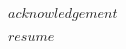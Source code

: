 \backmatter

\begin{acknowledgement}
$acknowledgement$
\end{acknowledgement}

\begin{resume}
$resume$
\end{resume}
